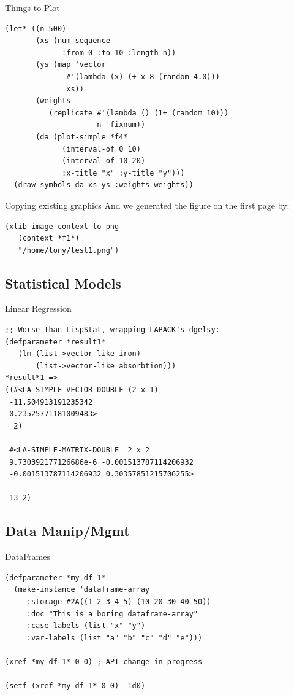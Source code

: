 \documentclass{beamer}
\begin{document}
\begin{frame}[fragile]{Things to Plot}
\small{
\begin{verbatim}
(let* ((n 500)
       (xs (num-sequence
             :from 0 :to 10 :length n))
       (ys (map 'vector
              #'(lambda (x) (+ x 8 (random 4.0)))
              xs))
       (weights
          (replicate #'(lambda () (1+ (random 10)))
                     n 'fixnum))
       (da (plot-simple *f4*
             (interval-of 0 10)
             (interval-of 10 20)
             :x-title "x" :y-title "y")))
  (draw-symbols da xs ys :weights weights))
\end{verbatim}
}
\end{frame}

\begin{frame}[fragile]{Copying existing graphics}
  And we generated the figure on the first page by:
\begin{verbatim}
(xlib-image-context-to-png
   (context *f1*)
   "/home/tony/test1.png")
\end{verbatim}
\end{frame}

\subsection{Statistical Models}
\label{sec:work:statmod}

\begin{frame}[fragile]{Linear Regression}
\small{
\begin{verbatim}
;; Worse than LispStat, wrapping LAPACK's dgelsy:
(defparameter *result1*
   (lm (list->vector-like iron)
       (list->vector-like absorbtion)))
*result*1 =>
((#<LA-SIMPLE-VECTOR-DOUBLE (2 x 1)
 -11.504913191235342
 0.23525771181009483>
  2)

 #<LA-SIMPLE-MATRIX-DOUBLE  2 x 2
 9.730392177126686e-6 -0.001513787114206932
 -0.001513787114206932 0.30357851215706255>   

 13 2)
\end{verbatim}
}
\end{frame}

\subsection{Data Manip/Mgmt}
\label{sec:work:data}

\begin{frame}[fragile]{DataFrames}
\small{
\begin{verbatim}
(defparameter *my-df-1*
  (make-instance 'dataframe-array
	 :storage #2A((1 2 3 4 5) (10 20 30 40 50))
	 :doc "This is a boring dataframe-array"
	 :case-labels (list "x" "y")
	 :var-labels (list "a" "b" "c" "d" "e")))

(xref *my-df-1* 0 0) ; API change in progress

(setf (xref *my-df-1* 0 0) -1d0)
\end{verbatim}
}
\end{frame}
\end{document}
